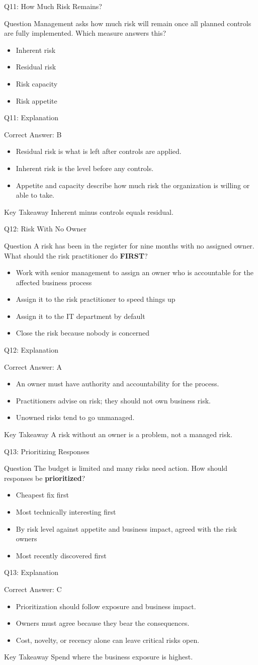 \documentclass[aspectratio=169]{beamer}
\newcommand{\hq}[7]{%
	\begin{frame}{Q#1: #2}
		\begin{block}{Question}
			#3
		\end{block}
		\begin{itemize}
			#4
		\end{itemize}
	\end{frame}
	\begin{frame}{Q#1: Explanation}
		\begin{block}{Correct Answer: #5}
			\begin{itemize}
				#6
			\end{itemize}
		\end{block}
		\begin{alertblock}{Key Takeaway}
			#7
		\end{alertblock}
	\end{frame}
}
\begin{document}
	\hq{11}{How Much Risk Remains?}
	{Management asks how much risk will remain once all planned controls are fully implemented. Which measure answers this?}
	{\item[\textbf{(A)}] Inherent risk
		\item[\textbf{(B)}] Residual risk
		\item[\textbf{(C)}] Risk capacity
		\item[\textbf{(D)}] Risk appetite}
	{B}
	{\item Residual risk is what is left after controls are applied.
		\item Inherent risk is the level before any controls.
		\item Appetite and capacity describe how much risk the organization is willing or able to take.}
	{Inherent minus controls equals residual.}
	
	\hq{12}{Risk With No Owner}
	{A risk has been in the register for nine months with no assigned owner. What should the risk practitioner do \textbf{FIRST}?}
	{\item[\textbf{(A)}] Work with senior management to assign an owner who is accountable for the affected business process
		\item[\textbf{(B)}] Assign it to the risk practitioner to speed things up
		\item[\textbf{(C)}] Assign it to the IT department by default
		\item[\textbf{(D)}] Close the risk because nobody is concerned}
	{A}
	{\item An owner must have authority and accountability for the process.
		\item Practitioners advise on risk; they should not own business risk.
		\item Unowned risks tend to go unmanaged.}
	{A risk without an owner is a problem, not a managed risk.}
	
	\hq{13}{Prioritizing Responses}
	{The budget is limited and many risks need action. How should responses be \textbf{prioritized}?}
	{\item[\textbf{(A)}] Cheapest fix first
		\item[\textbf{(B)}] Most technically interesting first
		\item[\textbf{(C)}] By risk level against appetite and business impact, agreed with the risk owners
		\item[\textbf{(D)}] Most recently discovered first}
	{C}
	{\item Prioritization should follow exposure and business impact.
		\item Owners must agree because they bear the consequences.
		\item Cost, novelty, or recency alone can leave critical risks open.}
	{Spend where the business exposure is highest.}
	
\end{document}
